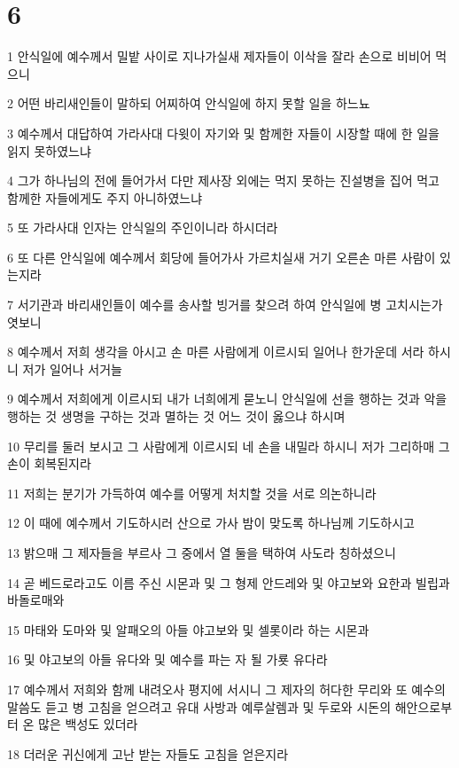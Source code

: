 \chapter{6}

\par 1 안식일에 예수께서 밀밭 사이로 지나가실새 제자들이 이삭을 잘라 손으로 비비어 먹으니
\par 2 어떤 바리새인들이 말하되 어찌하여 안식일에 하지 못할 일을 하느뇨
\par 3 예수께서 대답하여 가라사대 다윗이 자기와 및 함께한 자들이 시장할 때에 한 일을 읽지 못하였느냐
\par 4 그가 하나님의 전에 들어가서 다만 제사장 외에는 먹지 못하는 진설병을 집어 먹고 함께한 자들에게도 주지 아니하였느냐
\par 5 또 가라사대 인자는 안식일의 주인이니라 하시더라
\par 6 또 다른 안식일에 예수께서 회당에 들어가사 가르치실새 거기 오른손 마른 사람이 있는지라
\par 7 서기관과 바리새인들이 예수를 송사할 빙거를 찾으려 하여 안식일에 병 고치시는가 엿보니
\par 8 예수께서 저희 생각을 아시고 손 마른 사람에게 이르시되 일어나 한가운데 서라 하시니 저가 일어나 서거늘
\par 9 예수께서 저희에게 이르시되 내가 너희에게 묻노니 안식일에 선을 행하는 것과 악을 행하는 것 생명을 구하는 것과 멸하는 것 어느 것이 옳으냐 하시며
\par 10 무리를 둘러 보시고 그 사람에게 이르시되 네 손을 내밀라 하시니 저가 그리하매 그 손이 회복된지라
\par 11 저희는 분기가 가득하여 예수를 어떻게 처치할 것을 서로 의논하니라
\par 12 이 때에 예수께서 기도하시러 산으로 가사 밤이 맞도록 하나님께 기도하시고
\par 13 밝으매 그 제자들을 부르사 그 중에서 열 둘을 택하여 사도라 칭하셨으니
\par 14 곧 베드로라고도 이름 주신 시몬과 및 그 형제 안드레와 및 야고보와 요한과 빌립과 바돌로매와
\par 15 마태와 도마와 및 알패오의 아들 야고보와 및 셀롯이라 하는 시몬과
\par 16 및 야고보의 아들 유다와 및 예수를 파는 자 될 가룟 유다라
\par 17 예수께서 저희와 함께 내려오사 평지에 서시니 그 제자의 허다한 무리와 또 예수의 말씀도 듣고 병 고침을 얻으려고 유대 사방과 예루살렘과 및 두로와 시돈의 해안으로부터 온 많은 백성도 있더라
\par 18 더러운 귀신에게 고난 받는 자들도 고침을 얻은지라
